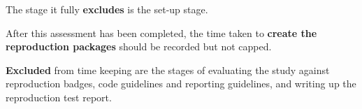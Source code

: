 The stage it fully \textbf{excludes} is the set-up stage.

After this assessment has been completed, the time taken to \textbf{create the reproduction packages} should be recorded but not capped.

\textbf{Excluded} from time keeping are the stages of evaluating the study against reproduction badges, code guidelines and reporting guidelines, and writing up the reproduction test report.